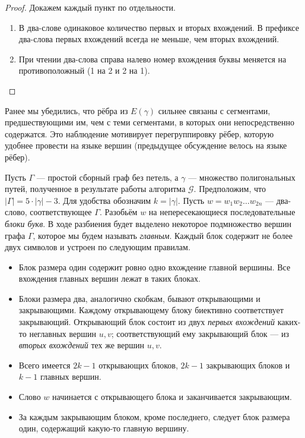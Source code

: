 \documentclass{article}
\theoremstyle{definition}
\newcommand{\G}{\mathcal{G}}
\begin{document}
\begin{proof} 
    Докажем каждый пункт по отдельности.
    \begin{enumerate}
        \item В два-слове одинаковое количество первых и вторых вхождений. В префиксе два-слова первых вхождений всегда не меньше, чем вторых вхождений.
        \item При чтении два-слова справа налево номер вхождения буквы меняется на противоположный (1 на 2 и 2 на 1).
    \end{enumerate}
\end{proof}

Ранее мы убедились, что рёбра из \(E(\gamma)\) сильнее связаны с сегментами, 
предшествующими им, чем с теми сегментами, в которых они непосредственно 
содержатся. Это наблюдение мотивирует перегруппировку рёбер, которую 
удобнее провести на языке вершин (предыдущее обсуждение велось на языке 
рёбер).

Пусть \(\Gamma\) — простой сборный граф без петель, а \(\gamma\) — множество 
полигональных путей, полученное в результате работы алгоритма \(\G\). 
Предположим, что \(|\Gamma| = 5\cdot |\gamma| - 3\). Для удобства обозначим 
\(k = |\gamma|\). Пусть \(w = w_1 w_2 \dots w_{2n}\) — два-слово, 
соответствующее \(\Gamma\). Разобьём \(w\) на непересекающиеся 
последовательные \emph{блоки букв}. В ходе разбиения будет выделено некоторое 
подмножество вершин графа \(\Gamma\), которое мы будем называть \emph{главным}. 
Каждый блок содержит не более двух символов и устроен по следующим 
правилам.

\begin{itemize}
    \item Блок размера один содержит ровно одно вхождение главной вершины. 
    Все вхождения главных вершин лежат в таких блоках.
    \item Блоки размера два, аналогично скобкам, бывают открывающими и 
    закрывающими. Каждому открывающему блоку биективно соответствует 
    закрывающий. Открывающий блок состоит из двух \emph{первых вхождений} 
    каких-то неглавных вершин \(u, v\); соответствующий ему закрывающий 
    блок — из \emph{вторых вхождений} тех же вершин \(u, v\).
    \item Всего имеется \(2k - 1\) открывающих блоков, \(2k - 1\) 
    закрывающих блоков и \(k - 1\) главных вершин.
    \item Слово \(w\) начинается с открывающего блока и заканчивается 
    закрывающим.
    \item За каждым закрывающим блоком, кроме последнего, следует блок 
    размера один, содержащий какую-то главную вершину.
\end{itemize}
\end{document}
